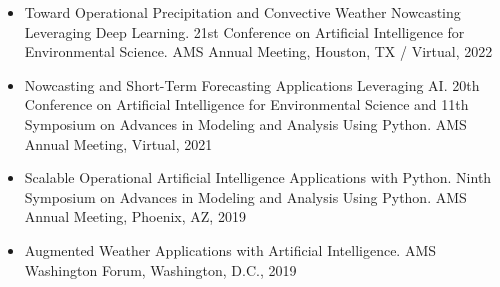 \documentclass[11pt,letterpaper]{article}
\begin{document}
\begin{itemize}[itemindent=-10pt]
 \item Toward Operational Precipitation and Convective Weather Nowcasting Leveraging Deep Learning. 21st Conference on Artificial Intelligence for Environmental Science. AMS Annual Meeting, Houston, TX / Virtual, 2022

 \item Nowcasting and Short-Term Forecasting Applications Leveraging AI. 20th Conference on Artificial Intelligence for Environmental Science and 11th Symposium on Advances in Modeling and Analysis Using Python. AMS Annual Meeting, Virtual, 2021

 \item Scalable Operational Artificial Intelligence Applications with Python. Ninth Symposium on Advances in Modeling and Analysis Using Python. AMS Annual Meeting, Phoenix, AZ, 2019
 
 \item Augmented Weather Applications with Artificial Intelligence. AMS Washington Forum, Washington, D.C., 2019
 

\end{itemize}
\end{document}
